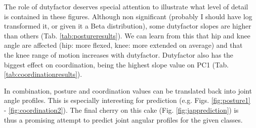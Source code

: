The role of dutyfactor deserves special attention to illustrate what level of detail is contained in these figures.
Although non significant (probably I should have log transformed it, or given it a Beta distribution), some dutyfactor slopes are higher than others (Tab. \ref{tab:postureresults}).
We can learn from this that hip and knee angle are affected (hip: more flexed, knee: more extended on average) and that the knee range of motion increases with dutyfactor.
Dutyfactor also has the biggest effect on coordination, being the highest slope value on PC1 (Tab. \ref{tab:coordinationresults}).


In combination, posture and coordination values can be translated back into joint angle profiles.
This is especially interesting for prediction (e.g. Figs. \ref{fig:posture1} - \ref{fig:coordination2}).
The final cherry on this cake (Fig. \ref{fig:japprediction}) is thus a promising attempt to predict joint angular profiles for the given classes.


